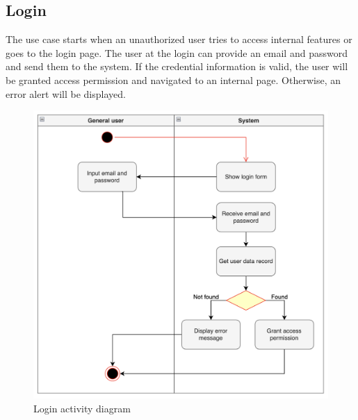 \subsection{Login}
The use case starts when an unauthorized user tries to access internal features or goes to the login page. The user at the login can provide an email and password and send them to the system. If the credential information is valid, the user will be granted access permission and navigated to an internal page. Otherwise, an error alert will be displayed.
\begin{figure}[H]
  \centering
  \includegraphics[width=1\textwidth]{Figures/login.png}
  \caption{Login activity diagram}
  \label{fig:login}
\end{figure}
\newpage

